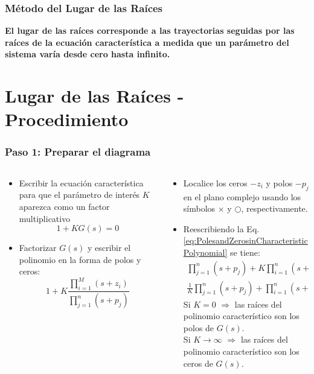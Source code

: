 \documentclass[aspectratio=169,handout]{beamer}
\theoremstyle{definition}
\theoremstyle{plain}
\theoremstyle{remark}
\begin{document}
\begin{frame}[c]\frametitle{Método del Lugar de las Raíces}
	\centering
	\textbf{El lugar de las raíces corresponde a las trayectorias seguidas por las raíces de la ecuación característica a medida que un parámetro del sistema varía desde cero hasta infinito.}
\end{frame}

\section{Lugar de las Raíces - Procedimiento}

\begin{frame}[<+->]\frametitle{Paso 1: Preparar el diagrama}
\small
\begin{columns}
	\begin{column}{0.5\textwidth}
	\begin{itemize}
		\item Escribir la ecuación característica para que el parámetro de interés $K$ aparezca como un factor multiplicativo
		\begin{equation*}
			1 + KG(s) = 0
		\end{equation*}
		\item Factorizar $G(s)$ y escribir el polinomio en la forma de polos y ceros:
		\begin{equation}
			1 + K \frac{\prod_{i=1}^M (s + z_i)}{\prod_{j=1}^n (s + p_j)}
			\label{eq:PolesandZerosinCharacteristicPolynomial}
		\end{equation}
	\end{itemize}
	\end{column}
	\begin{column}{0.5\textwidth}
	\begin{itemize}
		\item Localice los ceros $-z_i$ y polos $-p_j$ en el plano complejo usando los símbolos $\times$ y $\bigcirc$, respectivamente.
		\item Reescribiendo la Eq.\eqref{eq:PolesandZerosinCharacteristicPolynomial} se tiene:
		\begin{align*}
			\prod_{j=1}^n (s + p_j) + K \prod_{i=1}^n (s + z_j) &= 0\\
			\frac{1}{K}\prod_{j=1}^n (s + p_j) + \prod_{i=1}^n (s + z_j) &= 0
		\end{align*}
		\pause
		Si $K = 0$ $\Rightarrow$ las raíces del polinomio característico son los polos de $G(s)$.\\
		\pause
		Si $K \rightarrow \infty$ $\Rightarrow$ las raíces del polinomio característico son los ceros de $G(s)$.
	\end{itemize}
	\end{column}
\end{columns}
\end{frame}
\end{document}
